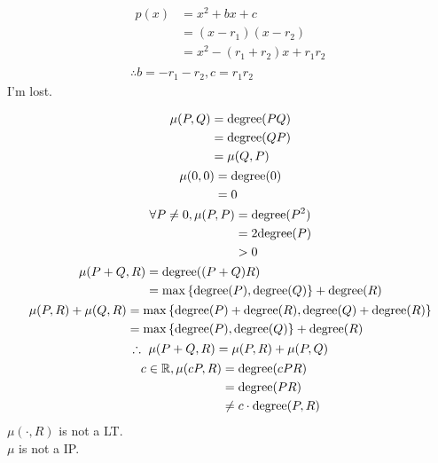 \documentclass{mathtoolkit}
\begin{document}
\begin{p}
  \item
    \begin{gather*}
      \begin{aligned}
        p(x) & = x^2 + bx +c \\
             & = (x - r_1) (x - r_2) \\
             & = x^2 - (r_1 + r_2) x + r_1 r_2
      \end{aligned} \\
      \therefore b = - r_1 - r_2, c = r_1 r_2
    \end{gather*}
    I'm lost.

  \item
    \begin{gather*}
      \begin{aligned}
        \mu(P, Q) & = \deg{PQ} \\
                  & = \deg{QP} \\
                  & = \mu(Q, P)
      \end{aligned} \\
      \begin{aligned}
        \mu(0, 0) & = \deg{0} \\
                  & = 0
      \end{aligned} \\
      \begin{aligned}
        \forall P \ne 0, \mu(P, P) & = \deg{P^2} \\
                                   & = 2 \deg{P} \\
                                   & > 0
      \end{aligned} \\
      \begin{aligned}
        \mu(P + Q, R) & = \deg{(P + Q} R) \\
                      & = \max \left\{ \deg{P}, \deg{Q} \right\} + \deg{R}
      \end{aligned} \\
      \begin{aligned}
        \mu(P, R) + \mu(Q, R) & = \max \left\{ \deg{P} + \deg{R}, \deg{Q} + \deg{R} \right\} \\
                              & = \max \left\{ \deg{P}, \deg{Q} \right\} + \deg{R}
      \end{aligned} \\
      \therefore \mu(P + Q, R) = \mu(P, R) + \mu(P, Q) \\
      \begin{aligned}
        c \in \field{R}, \mu(cP, R) & = \deg{cPR} \\
                                    & = \deg{PR} \\
                                    & \ne c \cdot \deg{P, R}
      \end{aligned} \\
    \end{gather*}
    \therefore $\mu(\cdot, R)$ is not a LT. \\
    \therefore $\mu$ is not a IP.


\end{p}
\end{document}
